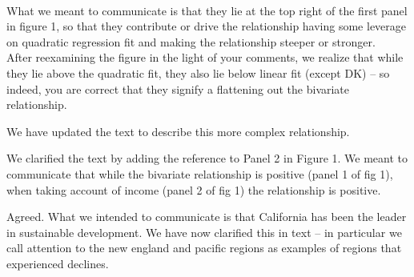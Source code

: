 \\


What we meant to communicate is that they lie at the top right of the first panel in figure 1, so that they contribute or drive the relationship having some leverage
on quadratic regression fit and making the relationship steeper or stronger. 
\\

After reexamining the figure in the light of your comments, we realize that while they
lie above the quadratic fit, they also lie below linear fit (except DK) -- so
indeed, you are correct that they signify a flattening out the bivariate relationship.

We have updated the text to describe this more complex relationship.



We clarified the text by adding the reference to Panel 2 in Figure 1. We meant to communicate that while
 the bivariate relationship is positive (panel 1 of fig 1),  when taking
 account of income (panel 2 of fig 1) the relationship is positive.


Agreed. What we intended to communicate is that California has been the leader in
sustainable development. We have now clarified this in text -- in particular we call attention to the new england
and pacific regions as examples of regions that experienced declines.


